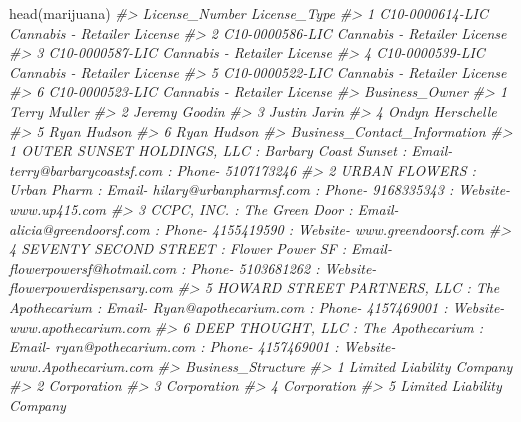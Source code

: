 \documentclass[
]{krantz}
\makeatletter
\newenvironment{Shaded}{\begin{snugshade}}{\end{snugshade}}
\newcommand{\CommentTok}[1]{\textcolor[rgb]{0.37,0.37,0.37}{\textit{#1}}}
\newcommand{\FunctionTok}[1]{\textcolor[rgb]{0,0,0}{#1}}
\newcommand{\NormalTok}[1]{#1}
\newenvironment{kframe}{%
\medskip{}
\setlength{\fboxsep}{.8em}
 \def\at@end@of@kframe{}%
 \ifinner\ifhmode%
  \def\at@end@of@kframe{\end{minipage}}%
  \begin{minipage}{\columnwidth}%
 \fi\fi%
 \def\FrameCommand##1{\hskip\@totalleftmargin \hskip-\fboxsep
 \colorbox{shadecolor}{##1}\hskip-\fboxsep
     \hskip-\linewidth \hskip-\@totalleftmargin \hskip\columnwidth}%
 \MakeFramed {\advance\hsize-\width
   \@totalleftmargin\z@ \linewidth\hsize
   \@setminipage}}%
 {\par\unskip\endMakeFramed%
 \at@end@of@kframe}
\renewenvironment{Shaded}{\begin{kframe}}{\end{kframe}}
\makeatother
\begin{document}
\begin{Shaded}
\begin{Highlighting}[]
\FunctionTok{head}\NormalTok{(marijuana)}
\CommentTok{\#\textgreater{}    License\_Number                License\_Type}
\CommentTok{\#\textgreater{} 1 C10{-}0000614{-}LIC Cannabis {-} Retailer License}
\CommentTok{\#\textgreater{} 2 C10{-}0000586{-}LIC Cannabis {-} Retailer License}
\CommentTok{\#\textgreater{} 3 C10{-}0000587{-}LIC Cannabis {-} Retailer License}
\CommentTok{\#\textgreater{} 4 C10{-}0000539{-}LIC Cannabis {-} Retailer License}
\CommentTok{\#\textgreater{} 5 C10{-}0000522{-}LIC Cannabis {-} Retailer License}
\CommentTok{\#\textgreater{} 6 C10{-}0000523{-}LIC Cannabis {-} Retailer License}
\CommentTok{\#\textgreater{}     Business\_Owner}
\CommentTok{\#\textgreater{} 1     Terry Muller}
\CommentTok{\#\textgreater{} 2    Jeremy Goodin}
\CommentTok{\#\textgreater{} 3     Justin Jarin}
\CommentTok{\#\textgreater{} 4 Ondyn Herschelle}
\CommentTok{\#\textgreater{} 5      Ryan Hudson}
\CommentTok{\#\textgreater{} 6      Ryan Hudson}
\CommentTok{\#\textgreater{}                                                                                                           Business\_Contact\_Information}
\CommentTok{\#\textgreater{} 1                             OUTER SUNSET HOLDINGS, LLC  : Barbary Coast Sunset : Email{-} terry@barbarycoastsf.com : Phone{-} 5107173246}
\CommentTok{\#\textgreater{} 2                           URBAN FLOWERS  : Urban Pharm : Email{-} hilary@urbanpharmsf.com : Phone{-} 9168335343 : Website{-} www.up415.com}
\CommentTok{\#\textgreater{} 3                      CCPC, INC.  : The Green Door : Email{-} alicia@greendoorsf.com : Phone{-} 4155419590 : Website{-} www.greendoorsf.com}
\CommentTok{\#\textgreater{} 4 SEVENTY SECOND STREET  : Flower Power SF : Email{-} flowerpowersf@hotmail.com : Phone{-} 5103681262 : Website{-} flowerpowerdispensary.com}
\CommentTok{\#\textgreater{} 5   HOWARD STREET PARTNERS, LLC  : The Apothecarium : Email{-} Ryan@apothecarium.com : Phone{-} 4157469001 : Website{-} www.apothecarium.com}
\CommentTok{\#\textgreater{} 6              DEEP THOUGHT, LLC  : The Apothecarium : Email{-} ryan@pothecarium.com : Phone{-} 4157469001 : Website{-} www.Apothecarium.com}
\CommentTok{\#\textgreater{}          Business\_Structure}
\CommentTok{\#\textgreater{} 1 Limited Liability Company}
\CommentTok{\#\textgreater{} 2               Corporation}
\CommentTok{\#\textgreater{} 3               Corporation}
\CommentTok{\#\textgreater{} 4               Corporation}
\CommentTok{\#\textgreater{} 5 Limited Liability Company}

\end{Highlighting}
\end{Shaded}
\end{document}
